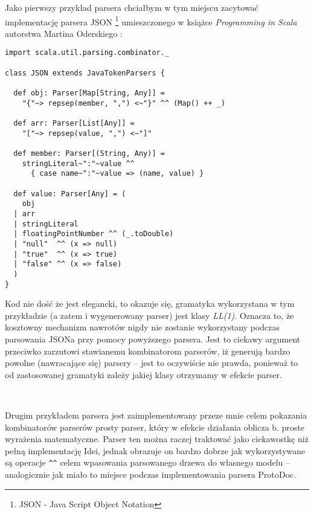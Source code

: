 Jako pierwszy przykład parsera chciałbym w tym miejscu zacytować implementację parsera JSON \footnote{JSON - Java Script Object Notation} umieszczonego w książce
\textit{Programming in Scala} autorstwa Martina Oderskiego \cite{odersky_scala}:

\begin{lstlisting}
import scala.util.parsing.combinator._

class JSON extends JavaTokenParsers {   

  def obj: Parser[Map[String, Any]] = 
    "{"~> repsep(member, ",") <~"}" ^^ (Map() ++ _)
    
  def arr: Parser[List[Any]] =
    "["~> repsep(value, ",") <~"]" 

  def member: Parser[(String, Any)] = 
    stringLiteral~":"~value ^^ 
      { case name~":"~value => (name, value) }

  def value: Parser[Any] = (
    obj
  | arr 
  | stringLiteral
  | floatingPointNumber ^^ (_.toDouble) 
  | "null"  ^^ (x => null) 
  | "true"  ^^ (x => true) 
  | "false" ^^ (x => false)
  )
}
\end{lstlisting}

Kod nie dość że jest elegancki, to okazuje się, gramatyka wykorzystana w tym przykładzie (a zatem i wygenerowany parser) jest klasy \textit{LL(1)}.
Oznacza to, że kosztowny mechanizm nawrotów nigdy nie zostanie wykorzystany podczas parsowania JSONa przy pomocy powyższego parsera. Jest to ciekawy argument
przeciwko zarzutowi stawianemu kombinatorom parserów, iż generują bardzo powolne (nawracające się) parsery -- jest to oczywiście nie prawda, ponieważ to 
od zastosowanej gramatyki zależy jakiej klasy otrzymamy w efekcie parser.

~\\\*

Drugim przykładem parsera jest zaimplementowany przeze mnie celem pokazania kombinatorów parserów prosty parser,
który w efekcie działania oblicza b. proste wyrażenia matematyczne. Parser ten można raczej traktować jako ciekawostkę niż pełną implementację Idei, 
jednak obrazuje on bardzo dobrze jak wykorzystywane są operacje \verb|^^| celem wpasowania parsowanego drzewa do własnego modelu -- analogicznie
jak miało to miejsce podczas implementowania parsera ProtoDoc.

